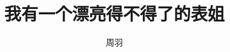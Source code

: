 ﻿\documentclass[11pt]{article}
\begin{document}
\title{我有一个漂亮得不得了的表姐}
\author{周羽}
\maketitle
\tableofcontents








\end{document}
